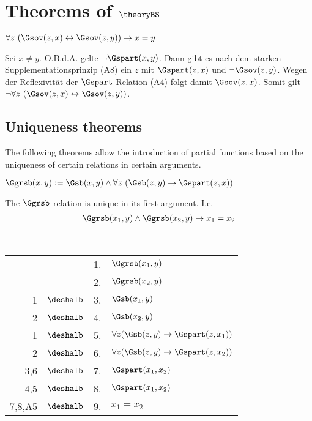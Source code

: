 \section{Theorems of $\theoryBS$}

\begin{satz}[T23.]\label{satz:t23}
    $\forall z\ (\Gsov(z,x) \leftrightarrow \Gsov(z,y)) \to x = y$
\end{satz}

\begin{bew}
    Sei $x \neq y$.
    O.B.d.A. gelte $\neg \Gspart(x,y)$. 
    Dann gibt es nach dem starken Supplementationsprinzip (A8) ein $z$ mit $\Gspart(z,x)$ und $\neg \Gsov(z,y)$. 
    Wegen der Reflexivität der $\Gspart$-Relation (A4) folgt damit $\Gsov(z,x)$.
    Somit gilt $\neg \forall z\ (\Gsov(z,x) \leftrightarrow \Gsov(z,y))$.
\end{bew}



\subsection{Uniqueness theorems}
The following theorems allow the introduction of partial functions based on the uniqueness of certain relations in certain arguments.

\begin{erin}
    $\Ggrsb(x,y) := \Gsb(x,y) \wedge \forall z\ (\Gsb(z,y) \to \Gspart(z,x))$
\end{erin}

\begin{satz}
    The $\Ggrsb$-relation is unique in its first argument. I.e.
    \begin{align*}
        \Ggrsb(x_1,y) \land \Ggrsb(x_2,y) \to x_1 = x_2
    \end{align*}
\end{satz}

\begin{bew}\ \\
    \begin{longtable}{r c c l}
        & & 1. & $\Ggrsb(x_1,y)$\\
        & & 2. & $\Ggrsb(x_2,y)$ \\
        1 & $\deshalb$ & 3. & $\Gsb(x_1,y)$ \\
        2 & $\deshalb$ & 4. & $\Gsb(x_2,y)$ \\
        1 & $\deshalb$ & 5. & $\forall z (\Gsb(z,y) \to \Gspart(z,x_1))$ \\
        2 & $\deshalb$ & 6. & $\forall z (\Gsb(z,y) \to \Gspart(z,x_2))$ \\
        3,6 & $\deshalb$ & 7. & $\Gspart(x_1,x_2)$ \\
        4,5 & $\deshalb$ & 8. & $\Gspart(x_1,x_2)$\\
        7,8,A5 & $\deshalb$ & 9. & $x_1 = x_2$
    \end{longtable}
\end{bew}

